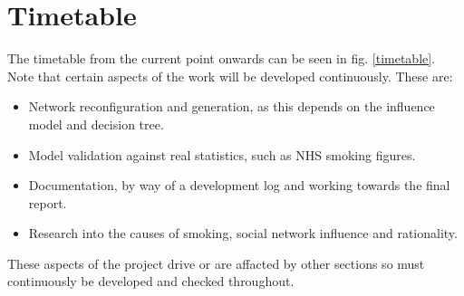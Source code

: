 \documentclass[]{article}
\begin{document}
\section{Timetable}
The timetable from the current point onwards can be seen in fig. \ref{timetable}. Note that certain aspects of the work will
be developed continuously. These are:
\begin{itemize}
\item Network reconfiguration and generation, as this depends on the influence model and decision tree.
\item Model validation against real statistics, such as NHS smoking figures.
\item Documentation, by way of a development log and working towards the final report.
\item Research into the causes of smoking, social network influence and rationality.
\end{itemize}
These aspects of the project drive or are affacted by other sections so must continuously be developed and checked throughout.
\end{document}
